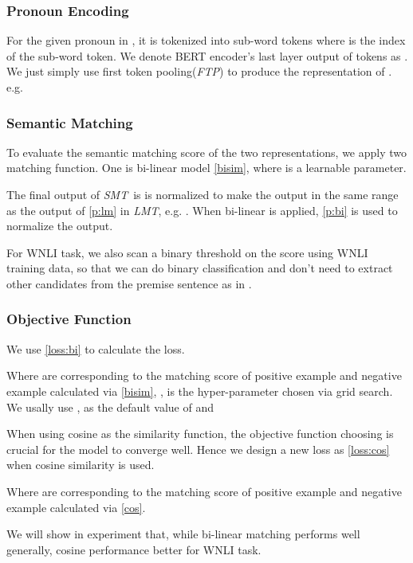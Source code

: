 \documentclass[11pt,a4paper]{article}
\newcommand{\lmt}{\textit{LMT}}
\newcommand{\smt}{\textit{SMT}}
\begin{document}
\subsubsection{Pronoun Encoding}
For the given pronoun  in , it is tokenized into  sub-word tokens  where  is the index of the sub-word token. We denote BERT\cite{devlin2018bert} encoder's last layer output of tokens  as . We just simply use first token pooling(\textit{FTP}) to produce the representation of . e.g. 


\subsubsection{Semantic Matching}
To evaluate the semantic matching score of the two representations, we apply two matching function. One is bi-linear model \eqref{bisim}, where  is a learnable parameter. 





The final output of \smt~is is normalized to make the output in the same range as the output of \eqref{p:lm} in \lmt, e.g. .
When bi-linear is applied, \eqref{p:bi} is used to normalize the output. 



For WNLI task, we also scan a binary threshold on the score using WNLI training data, so that we can do binary  classification and don't need to extract other candidates from the premise sentence as in \cite{kocijan2019surprisingly}.

\subsubsection{Objective Function}
We use \eqref{loss:bi} to calculate the loss.


Where   are corresponding to the matching score of positive example and negative example calculated via \eqref{bisim}, ,  is the hyper-parameter chosen via grid search. We usally use ,  as the default value of   and 

When using cosine as the similarity function, the objective function choosing is crucial for the model to converge well. Hence we design a new loss as \eqref{loss:cos} when cosine similarity is used.


Where   are corresponding to the matching score of positive example and negative example calculated via \eqref{cos}.

We will show in experiment that, while bi-linear matching performs well generally, cosine performance better for WNLI task.
\end{document}
